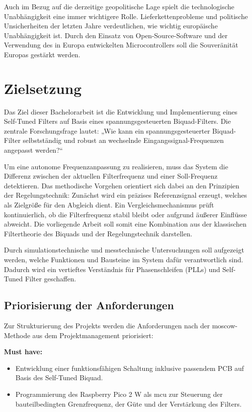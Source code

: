 Auch im Bezug auf die derzeitige geopolitische Lage spielt die technologische Unabhängigkeit eine immer wichtigere Rolle. Lieferkettenprobleme und politische Unsicherheiten der letzten Jahre verdeutlichen, wie wichtig europäische Unabhängigkeit ist. Durch den Einsatz von Open-Source-Software und der Verwendung des in Europa entwickelten Microcontrollers soll die Souveränität Europas gestärkt werden. 


\section{Zielsetzung}
Das Ziel dieser Bachelorarbeit ist die Entwicklung und Implementierung eines Self-Tuned Filters auf Basis eines spannungsgesteuerten Biquad-Filters. Die zentrale Forschungsfrage lautet: „Wie kann ein spannungsgesteuerter Biquad-Filter selbstständig und robust an wechselnde Eingangssignal-Frequenzen angepasst werden?“\par
\medskip
Um eine autonome Frequenzanpassung zu realisieren, muss das System die Differenz zwischen der aktuellen Filterfrequenz und einer Soll-Frequenz detektieren. Das methodische Vorgehen orientiert sich dabei an den Prinzipien der Regelungstechnik: Zunächst wird ein präzises Referenzsignal erzeugt, welches als Zielgröße für den Abgleich dient. Ein Vergleichsmechanismus prüft kontinuierlich, ob die Filterfrequenz stabil bleibt oder aufgrund äußerer Einflüsse abweicht. Die vorliegende Arbeit soll somit eine Kombination aus der klassischen Filtertheorie des Biquads und der Regelungstechnik darstellen.\par
\medskip
Durch simulationstechnische und messtechnische Untersuchungen soll aufgezeigt werden, welche Funktionen und Bausteine im System dafür verantwortlich sind. Dadurch wird ein vertieftes Verständnis für Phasenschleifen (PLLs) und Self-Tuned Filter geschaffen.\par

\subsection{Priorisierung der Anforderungen}
Zur Strukturierung des Projekts werden die Anforderungen nach der \gls{moscow}-Methode aus dem Projektmanagement priorisiert:

\textbf{Must have:}
\begin{itemize}
    \item Entwicklung einer funktionsfähigen Schaltung inklusive passendem PCB auf Basis des Self-Tuned Biquad. \cite{Lab_Kit_PRO} 
    \item Programmierung des Raspberry Pico 2 W als \gls{mcu} zur Steuerung der bauteilbedingten Grenzfrequenz, der Güte und der Verstärkung des Filters.
\end{itemize}

